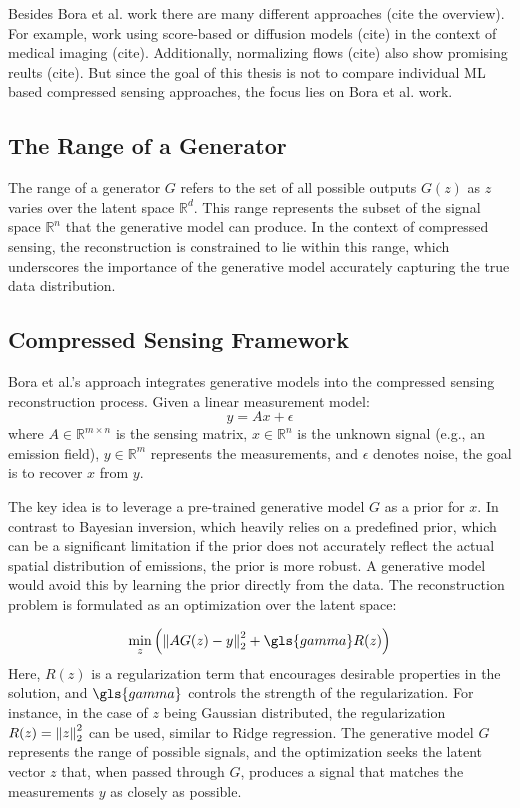 Besides Bora et al. work there are many different approaches (cite the overview).
For example, work using score-based or diffusion models (cite) in the context of medical imaging (cite).
Additionally, normalizing flows (cite) also show promising reults (cite).
But since the goal of this thesis is not to compare individual ML based compressed sensing approaches, the focus lies on Bora et al. work.

\subsection{The Range of a Generator}

The range of a generator $G$ refers to the set of all possible outputs $G(z)$ as $z$ varies over the latent space $\mathbb{R}^d$.
This range represents the subset of the signal space $\mathbb{R}^n$ that the generative model can produce.
In the context of compressed sensing, the reconstruction is constrained to lie within this range, which underscores the importance of the generative model accurately capturing the true data distribution.

\subsection{Compressed Sensing Framework}

Bora et al.'s approach integrates generative models into the compressed sensing reconstruction process.
Given a linear measurement model:
\begin{equation}
 y = A x + \epsilon
\end{equation}
where $A \in \mathbb{R}^{m \times n}$ is the sensing matrix, $x \in \mathbb{R}^n$ is the unknown signal (e.g., an emission field), $y \in \mathbb{R}^m$ represents the measurements, and $\epsilon$ denotes noise, the goal is to recover $x$ from $y$.

The key idea is to leverage a pre-trained generative model $G$ as a prior for $x$.
In contrast to Bayesian inversion, which heavily relies on a predefined prior, which can be a significant limitation if the prior does not accurately reflect the actual spatial distribution of emissions, the prior is more robust.
A generative model would avoid this by learning the prior directly from the data.
The reconstruction problem is formulated as an optimization over the latent space:

\begin{equation}
 \min_{z}{\left( \norm{A G(z) - y}_2^2 + \gls{gamma} R(z) \right)}
\end{equation}
Here, $R(z)$ is a regularization term that encourages desirable properties in the solution, and $\gls{gamma}$ controls the strength of the regularization.
For instance, in the case of $z$ being Gaussian distributed, the regularization $R(z) = \left\lVert z\right\rVert_2^2$ can be used, similar to Ridge regression.
The generative model $G$ represents the range of possible signals, and the optimization seeks the latent vector $z$ that, when passed through $G$, produces a signal that matches the measurements $y$ as closely as possible.


